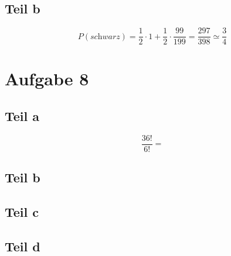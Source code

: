 \documentclass[10pt,a4paper]{article}
\begin{document}
\subsection{Teil b}
\begin{equation}
  P(\textit{schwarz}) = \frac{1}{2} \cdot 1 + \frac{1}{2} \cdot \frac{99}{199} = \frac{297}{398} \simeq \frac{3}{4}
\end{equation}

\section{Aufgabe 8}

\subsection{Teil a}
\begin{equation}
  \frac{36!}{6!} = 
\end{equation}

\subsection{Teil b}

\subsection{Teil c}

\subsection{Teil d}
\end{document}
